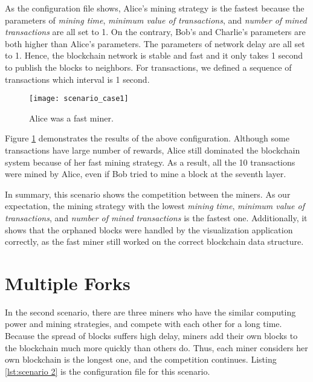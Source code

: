 As the configuration file shows, Alice's mining strategy is the fastest because the parameters of \textit{mining time}, \textit{minimum value of transactions}, and \textit{number of mined transactions} are all set to 1. On the contrary, Bob's and Charlie's parameters are both higher than Alice's parameters. The parameters of network delay are all set to 1. Hence, the blockchain network is stable and fast and it only takes 1 second to publish the blocks to neighbors. For transactions, we defined a sequence of transactions which interval is 1 second.

\begin{figure}[htb]
    \centering
    \texttt{[image: scenario\_case1]}
    \caption{Alice was a fast miner.}
    \label{fig:alice was a fast miner}
\end{figure}

Figure \ref{fig:alice was a fast miner} demonstrates the results of the above configuration. Although some transactions have large number of rewards, Alice still dominated the blockchain system because of her fast mining strategy. As a result, all the 10 transactions were mined by Alice, even if Bob tried to mine a block at the seventh layer. 

In summary, this scenario shows the competition between the miners. As our expectation, the mining strategy with the lowest \textit{mining time}, \textit{minimum value of transactions}, and \textit{number of mined transactions} is the fastest one. Additionally, it shows that the orphaned blocks were handled by the visualization application correctly, as the fast miner still worked on the correct blockchain data structure.

\section{Multiple Forks}

In the second scenario, there are three miners who have the similar computing power and mining strategies, and compete with each other for a long time. Because the spread of blocks suffers high delay, miners add their own blocks to the blockchain much more quickly than others do. Thus, each miner considers her own blockchain is the longest one, and the competition continues. Listing \ref{lst:scenario 2} is the configuration file for this scenario.

